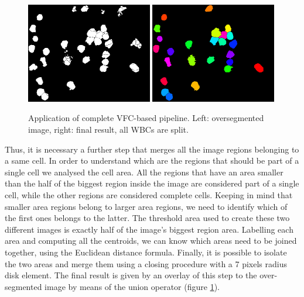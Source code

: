 \documentclass[final,a4paper,12pt,english]{UnicaPhdThesis3}
\begin{document}
\begin{figure}[!b]
	\centering
	\includegraphics[width=0.49\textwidth]{images/2018_1_visapp/figure8.png}
	\includegraphics[width=0.49\textwidth]{images/2018_1_visapp/detection.png}
	\caption{\label{fig:vfc2}Application of complete VFC-based pipeline. Left: oversegmented image, right: final result, all WBCs are split.}
\end{figure}
Thus, it is necessary a further step that merges all the image regions belonging to a same cell. In order to understand which are the regions that should be part of a single cell we analysed the cell area.
All the regions that have an area smaller than the half of the biggest region inside the image are considered part of a single cell, while the other regions are considered complete cells.
Keeping in mind that smaller area regions belong to larger area regions, we need to identify which of the first ones belongs to the latter. The threshold area used to create these two different images is exactly half of the image's biggest region area. Labelling each area and computing all the centroids, we can know which areas need to be joined together, using the Euclidean distance formula. Finally, it is possible to isolate the two areas and merge them using a closing procedure with a 7 pixels radius disk element. The final result is given by an overlay of this step to the over-segmented image by means of the union operator (figure \ref{fig:vfc2}).
\end{document}
